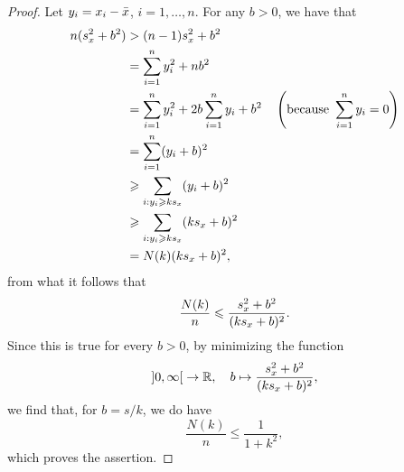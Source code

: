 \begin{proof}
  Let \(y_{i}=x_{i}-\bar{x}\), \(i=1,\ldots,n\). For any \(b>0\), we have
  that
  \begin{align*}
    n(s_{x}^{2}+b^{2})
    &>
    (n-1)s_{x}^{2}+b^{2}
    \\
    &=
    \sum_{i=1}^{n}y_{i}^{2}+nb^{2}
    \\
    &=
    \sum_{i=1}^{n}y_{i}^{2}+2b\sum_{i=1}^{n}y_{i}+b^{2}\quad\left(\textup{because}\,\,\sum_{i=1}^{n}y_{i}=0\right)
    \\
    &=
    \sum_{i=1}^{n}(y_{i}+b)^{2}
    \\
    &\geqslant
    \sum_{i:y_{i}\geqslant{ks_{x}}}(y_{i}+b)^{2}
    \\
    &\geqslant
    \sum_{i:y_{i}\geqslant{ks_{x}}}(ks_{x}+b)^{2}
    \\
    &=
    N(k)(ks_{x}+b)^{2},
  \end{align*}
  from what it follows that
  \[
    \frac{N(k)}{n}
    \leqslant
    \frac{s_{x}^{2}+b^{2}}{(ks_{x}+b)^{2}}.
  \]
  Since this is true for every \(b>0\), by minimizing the function
  \[
    \ointerval{0}{\infty}\to\reals,
    \quad
    b\mapsto{\frac{\samplevariance{x}+b^{2}}{(k\samplestandarddeviation{x}+b)^{2}}},
  \]
  we find that, for \(b=s/k\), we do have
  \[
    \frac{N(k)}{n}\leqslant{\frac{1}{1+k^{2}}},
  \]
  which proves the assertion.
\end{proof}
